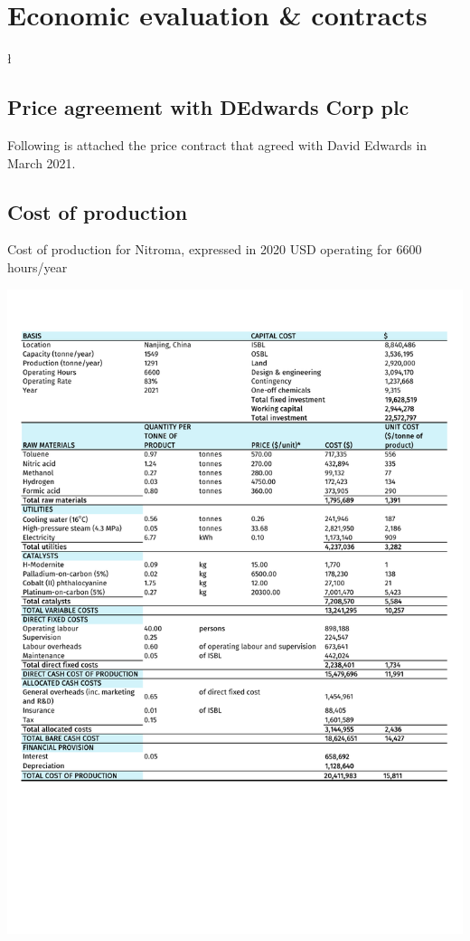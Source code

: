 \section{Economic evaluation \& contracts}
\l

\subsection{Price agreement with DEdwards Corp plc}
\label{sec:price-agreement}
Following is attached the price contract that agreed with David Edwards in March 2021.


\subsection{Cost of production}
\label{sec:COP}
\begin{table}[H]
    \centering
\caption{Cost of production for Nitroma, expressed in 2020 USD operating for 6600 hours/year}
 \label{Cost_of_production}
\includegraphics[clip, trim=0cm 5cm 0cm 0cm, width=\linewidth]{chapters/Z-support/attachments/Production.pdf}
\end{table}

